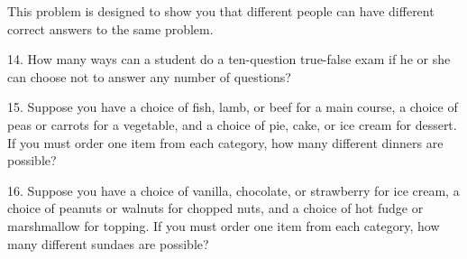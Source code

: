 \documentclass[10pt,]{book}
\theoremstyle{plain}
\theoremstyle{definition}
\begin{document}
\begin{exercisegroup}
\par
This problem is designed to show you that different people can have different correct answers to the same problem.%
\par\smallskip
\item[14.]\hypertarget{exercise-55}{} How many ways can a student do a ten-question true-false exam if he or she can choose not to answer any number of questions?\par\smallskip
\item[15.]\hypertarget{exercise-56}{} Suppose you have a choice of fish, lamb, or beef for a main course, a choice of peas or carrots for a vegetable, and a choice of pie, cake, or ice cream for dessert. If you must order one item from each category, how many different dinners are possible?%
\par\smallskip
\item[16.]\hypertarget{exercise-57}{} Suppose you have a choice of vanilla, chocolate, or strawberry for ice cream, a choice of peanuts or walnuts for chopped nuts, and a choice of hot fudge or marshmallow for topping. If you must order one item from each category, how many different sundaes are possible?\par\smallskip
\end{exercisegroup}
\par\smallskip\noindent
\end{document}
